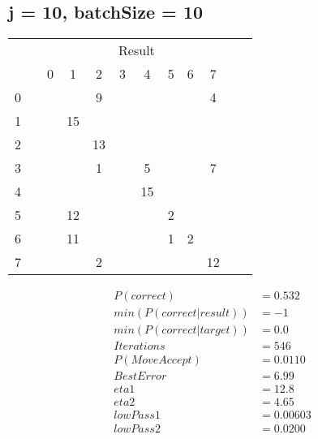 \documentclass[10pt, conference, compsocconf]{IEEEtran}
\begin{document}
\subsection{j = 10, batchSize = 10}
\begin{center}
\begin{tabular}{l*{10}{c}r}
& & & & & \multicolumn{2}{c}{Result}  & & \\
 &\vline& 0 & 1 & 2 & 3 & 4 & 5 & 6 & 7 \\
\hline
0 &\vline&   &    &   9&    &    &    &    &   4 \\
 1 &\vline&   &  15&    &    &    &    &    &     \\
 2 &\vline&   &    &  13&    &    &    &    &     \\
 3 &\vline&   &    &   1&    &   5&    &    &   7 \\
 4 &\vline&   &    &    &    &  15&    &    &     \\
 5 &\vline&   &  12&    &    &    &   2&    &     \\
 6 &\vline&   &  11&    &    &    &   1&   2&     \\
 7 &\vline&   &    &   2&    &    &    &    &  12 \\
\end{tabular}
\begin{align}
P( correct ) &=  0.532\\
min( P( correct |  result  ) )  &=   -1\\
min( P( correct | target ) )  &=   0.0\\
Iterations &=   546\\
P(Move Accept) &=   0.0110\\
Best Error &=   6.99\\
eta1    &=    12.8\\
eta2     &=   4.65\\
lowPass1 &=   0.00603\\
lowPass2  &=  0.0200
\end{align}
\end{center}
\end{document}

